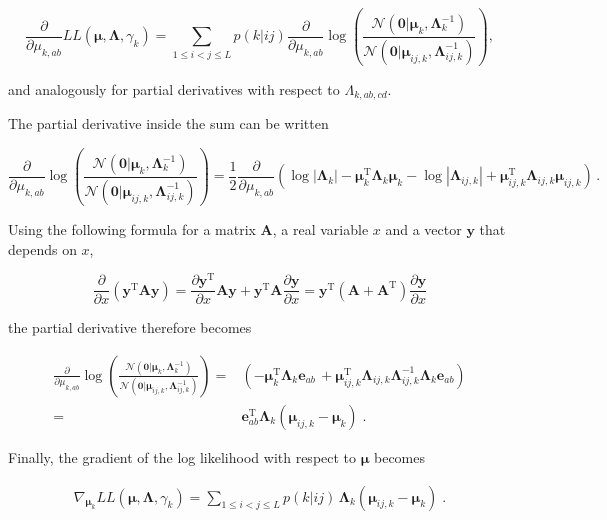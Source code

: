 \documentclass[12pt,a4paper,twoside]{book}
\newcommand{\Gauss}{\mathcal{N}}
\newcommand{\Lijk}{\mathbf{\Lambda}_{ij,k}}
\newcommand{\Lk}{\mathbf{\Lambda}_k}
\newcommand{\muijk}{\mathbf{\mu}_{ij,k}}
\newcommand{\muk}{\mathbf{\mu}_k}
\theoremstyle{definition}
\theoremstyle{definition}
\theoremstyle{remark}
\begin{document}
\begin{equation}
  \frac{\partial}{\partial \mu_{k,ab}}  L\!L(\mathbf{\mu}, \mathbf{\Lambda}, \gamma_k)
    = \sum_{1\le i<j\le L}  p(k | ij)  \frac{\partial}{\partial \mu_{k,ab}} \log \left( \frac{ \Gauss(\mathbf{0} | \muk, \Lk^{-1})}{\Gauss( \mathbf{0} | \muijk, \Lijk^{-1})} \right) ,
\label{eq:gradient-LL-mukab}
\end{equation}

and analogously for partial derivatives with respect to
\(\Lambda_{k,ab,cd}\).

The partial derivative inside the sum can be written

\begin{equation}
     \frac{\partial}{\partial \mu_{k,ab}} \log \left( \frac{ \Gauss(\mathbf{0} | \muk, \Lk^{-1})}{\Gauss( \mathbf{0} | \muijk, \Lijk^{-1})} \right)
    = \frac{1}{2}  \frac{\partial}{\partial \mu_{k,ab}}   \left( \log | \Lk | - \muk^\mathrm{T} \Lk \muk - \log | \Lijk | + \muijk^\mathrm{T} \Lijk \muijk \right)\,.
\end{equation}

Using the following formula for a matrix \(\mathbf{A}\), a real variable
\(x\) and a vector \(\mathbf{y}\) that depends on \(x\),

\begin{equation}
    \frac{\partial}{\partial x} \left( \mathbf{y}^\mathrm{T} \mathbf{A} \mathbf{y} \right) = \frac{\partial \mathbf{y}^\mathrm{T}}{\partial x}  \mathbf{A} \mathbf{y} + \mathbf{y}^\mathrm{T} \mathbf{A} \frac{\partial \mathbf{y}}{\partial x}  =  \mathbf{y}^\mathrm{T} (\mathbf{A} + \mathbf{A}^\mathrm{T}) \frac{\partial \mathbf{y}}{\partial x} 
\label{eq:matrix-gradient}
\end{equation}

the partial derivative therefore becomes

\begin{align}
     \frac{\partial}{\partial \mu_{k,ab}} \log \left( \frac{ \Gauss(\mathbf{0} | \muk, \Lk^{-1})}{\Gauss( \mathbf{0} | \muijk, \Lijk^{-1})} \right)
    =& \left( -\muk^\mathrm{T} \Lk \mathbf{e}_{ab} \, +  \muijk^\mathrm{T} \Lijk \Lijk^{-1} \Lk \mathbf{e}_{ab} \right) \\
    =& \mathbf{e}^\mathrm{T}_{ab} \Lk ( \muijk - \muk ) \; . 
\end{align}

Finally, the gradient of the log likelihood with respect to
\(\mathbf{\mu}\) becomes

\begin{align}
    \nabla_{\muk} L\!L(\mathbf{\mu}, \mathbf{\Lambda}, \gamma_k)
    =  \sum_{1\le i<j\le L}  p(k|ij)  \,  \Lk \left(  \muijk  - \muk \right) \; .
\label{eq:gradient-muk-final}
\end{align}
\end{document}
